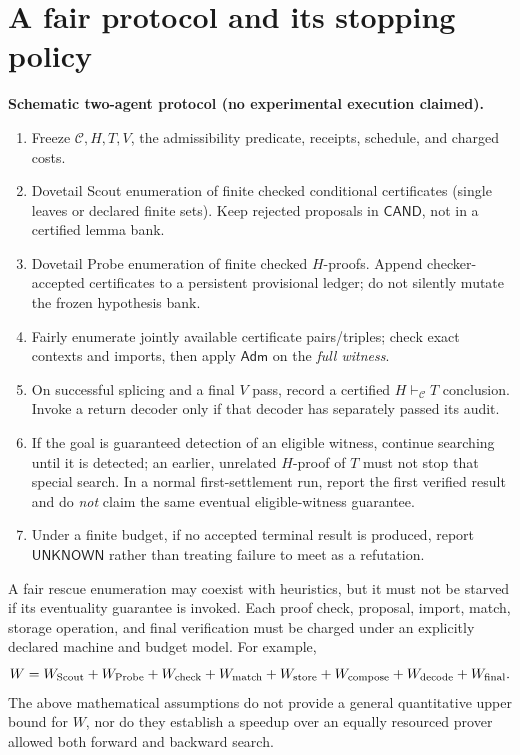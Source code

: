 \documentclass[11pt,letterpaper]{article}
\theoremstyle{definition}
\newcommand{\C}{\mathcal C}
\newcommand{\vdC}{\vdash_{\mathcal C}}
\newcommand{\Adm}{\mathsf{Adm}}
\newcommand{\UNKNOWN}{\mathsf{UNKNOWN}}
\begin{document}
\section{A fair protocol and its stopping policy}
\begin{keybox}
\textbf{Schematic two-agent protocol (no experimental execution claimed).}
\begin{enumerate}[label=\textbf{\arabic*.}]
\item Freeze $\C,H,T,V$, the admissibility predicate, receipts, schedule, and charged costs.
\item Dovetail Scout enumeration of finite checked conditional certificates
 (single leaves or declared finite sets). Keep rejected proposals in
 $\mathsf{CAND}$, not in a certified lemma bank.
\item Dovetail Probe enumeration of finite checked $H$-proofs. Append
 checker-accepted certificates to a persistent provisional ledger; do
 not silently mutate the frozen hypothesis bank.
\item Fairly enumerate jointly available certificate pairs/triples;
 check exact contexts and imports, then apply $\Adm$ on the \emph{full witness}.
\item On successful splicing and a final $V$ pass, record a certified
 $H\vdC T$ conclusion. Invoke a return decoder only if that decoder
 has separately passed its audit.
\item If the goal is guaranteed detection of an eligible witness,
 continue searching until it is detected; an earlier, unrelated
 $H$-proof of $T$ must not stop that special search. In a normal
 first-settlement run, report the first verified result and do
 \emph{not} claim the same eventual eligible-witness guarantee.
\item Under a finite budget, if no accepted terminal result is produced,
 report $\UNKNOWN$ rather than treating failure to meet as a refutation.
\end{enumerate}
\end{keybox}

A fair rescue enumeration may coexist with heuristics, but it must not
be starved if its eventuality guarantee is invoked. Each proof check,
proposal, import, match, storage operation, and final verification must
be charged under an explicitly declared machine and budget model.
For example,
\[
 W=W_{\rm Scout}+W_{\rm Probe}+W_{\rm check}+W_{\rm match}
 +W_{\rm store}+W_{\rm compose}+W_{\rm decode}+W_{\rm final}.
\]
The above mathematical assumptions do not provide a general quantitative
upper bound for $W$, nor do they establish a speedup over an equally
resourced prover allowed both forward and backward search.
\end{document}
